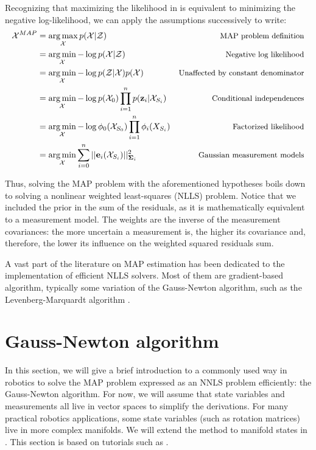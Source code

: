 Recognizing that maximizing the likelihood in  is equivalent to minimizing the negative log-likelihood, we can
apply the assumptions successively to write:
%
\begin{align}
    \mathcal{X}^{MAP} 
    &= \operatorname*{arg\,max}_{\mathcal{X}} p(\mathcal{X} | \mathcal{Z}) &\text{\small MAP problem definition}
    \\
    &= \operatorname*{arg\,min}_{\mathcal{X}} - \log p(\mathcal{X} | \mathcal{Z}) &\text{\small Negative log likelihood}
    \\
    &= \operatorname*{arg\,min}_{\mathcal{X}} - \log p(\mathcal{Z} | \mathcal{X}) p(\mathcal{X}) &\text{\small Unaffected by constant denominator}
    \\
    &= \operatorname*{arg\,min}_{\mathcal{X}} - \log p(\mathcal{X}_0) \prod_{i=1}^{n} p({\bf z}_i | \mathcal{X}_{S_i})  &\text{\small Conditional independences}
    \\
    &= \operatorname*{arg\,min}_{\mathcal{X}} - \log \phi_0(\mathcal{X}_{S_0}) \prod_{i=1}^{n} \phi_i(X_{S_i}) &\text{\small Factorized likelihood}
    \\
    &= \operatorname*{arg\,min}_{\mathcal{X}}  \sum_{i=0}^{n} ||{\bf e}_i(\mathcal{X}_{S_i})||_{{\bm \Sigma}_i}^2  &\text{\small Gaussian measurement models}
\end{align}

Thus, solving the MAP problem with the aforementioned hypotheses boils down to solving a nonlinear weighted least-squares (NLLS) problem.
Notice that we included the prior in the sum of the residuals, as it is mathematically equivalent to a measurement model. 
The weights are the inverse of the measurement covariances: the more uncertain a measurement is, the higher its covariance and, therefore, the lower its influence
on the weighted squared residuals sum. 

A vast part of the literature on MAP estimation has been dedicated to the implementation of efficient \adhoc NLLS solvers. Most of them are 
gradient-based algorithm, typically some variation of the Gauss-Newton algorithm, such as the Levenberg-Marquardt algorithm \cite{boyd2004convex}.





%
%
%
%
%
%
%
\section{Gauss-Newton algorithm}
In this section, we will give a brief introduction to a commonly used way in robotics to solve the MAP problem expressed as an NNLS problem efficiently: the Gauss-Newton algorithm.
For now, we will assume that state variables and measurements all live in vector spaces to simplify the derivations. For many practical robotics applications,
some state variables (such as rotation matrices) live in more complex manifolds.
We will extend the method to manifold states in . This section is based on tutorials such as \cite{dellaert2017factor,sola2017course}. 



